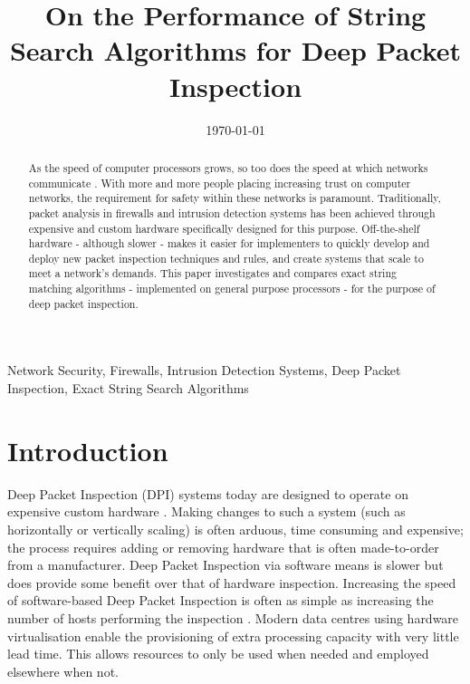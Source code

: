 \documentclass[9pt, conference]{IEEEtran}
\begin{document}
\title{On the Performance of String Search Algorithms for Deep Packet Inspection}
\date{\today}
\maketitle

\begin{abstract}
    As the speed of computer processors grows, so too does the speed at which networks communicate \citep{neilsen1998}. With more and more people placing increasing trust on computer networks, the requirement for safety within these networks is paramount. Traditionally, packet analysis in firewalls and intrusion detection systems has been achieved through expensive and custom hardware specifically designed for this purpose. Off-the-shelf hardware - although slower - makes it easier for implementers to quickly develop and deploy new packet inspection techniques and rules, and create systems that scale to meet a network's demands. This paper investigates and compares exact string matching algorithms - implemented on general purpose processors - for the purpose of deep packet inspection.
\end{abstract}

\begin{keywords}
    Network Security, Firewalls, Intrusion Detection Systems, Deep Packet Inspection, Exact String Search Algorithms
\end{keywords}


\section{Introduction}

Deep Packet Inspection (DPI) systems today are designed to operate on expensive custom hardware \citep{abuhmed2007}. Making changes to such a system (such as horizontally or vertically scaling) is often arduous, time consuming and expensive; the process requires adding or removing hardware that is often made-to-order from a manufacturer. Deep Packet Inspection via software means is slower but does provide some benefit over that of hardware inspection. Increasing the speed of software-based Deep Packet Inspection is often as simple as increasing the number of hosts performing the inspection \citep{chaudhary2011}. Modern data centres using hardware virtualisation enable the provisioning of extra processing capacity with very little lead time. This allows resources to only be used when needed and employed elsewhere when not. 
\end{document}
